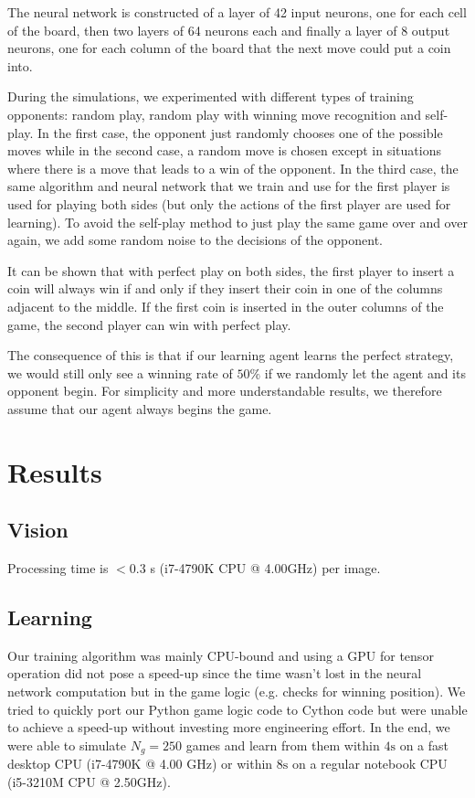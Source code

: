 \documentclass[10pt,twocolumn,letterpaper]{article}
\begin{document}
The neural network is constructed of a layer of 42 input neurons, one for each cell of the board, then two layers of 64 neurons each and finally a layer of 8 output neurons, one for each column of the board that the next move could put a coin into.

During the simulations, we experimented with different types of training opponents: random play, random play with winning move recognition and self-play.
In the first case, the opponent just randomly chooses one of the possible moves while in the second case, a random move is chosen except in situations where there is a move that leads to a win of the opponent.
In the third case, the same algorithm and neural network that we train and use for the first player is used for playing both sides (but only the actions of the first player are used for learning).
To avoid the self-play method to just play the same game over and over again, we add some random noise to the decisions of the opponent.

It can be shown that with perfect play on both sides, the first player to insert a coin will always win if and only if they insert their coin in one of the columns adjacent to the middle.
If the first coin is inserted in the outer columns of the game, the second player can win with perfect play.

The consequence of this is that if our learning agent learns the perfect strategy, we would still only see a winning rate of $50\%$ if we randomly
let the agent and its opponent begin.
For simplicity and more understandable results, we therefore assume that our agent always begins the game.

\section{Results}

\subsection{Vision}
Processing time is $< 0.3$ s (i7-4790K CPU @ 4.00GHz) per image.

\subsection{Learning}
Our training algorithm was mainly CPU-bound and using a GPU for tensor
operation did not pose a speed-up since the time wasn't lost in the neural
network computation but in the game logic (e.g. checks for winning position).
We tried to quickly port our Python game logic code to Cython code but were
unable to achieve a speed-up without investing more engineering effort.
In the end, we were able to simulate $N_g = 250$ games and learn from
them within $4\mathrm{s}$ on a fast desktop CPU (i7-4790K @ 4.00 GHz)
or within $8 \mathrm{s}$ on a regular notebook CPU (i5-3210M CPU @ 2.50GHz).
\end{document}
